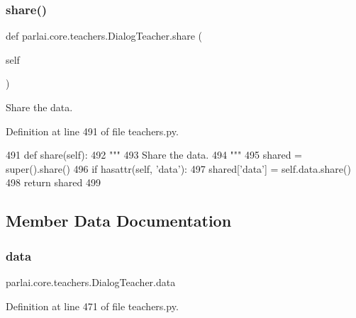 \subsubsection{\texorpdfstring{share()}{share()}}
{\footnotesize\ttfamily def parlai.\+core.\+teachers.\+Dialog\+Teacher.\+share (\begin{DoxyParamCaption}\item[{}]{self }\end{DoxyParamCaption})}

\begin{DoxyVerb}Share the data.
\end{DoxyVerb}
 

Definition at line 491 of file teachers.\+py.


\begin{DoxyCode}
491     \textcolor{keyword}{def }share(self):
492         \textcolor{stringliteral}{"""}
493 \textcolor{stringliteral}{        Share the data.}
494 \textcolor{stringliteral}{        """}
495         shared = super().share()
496         \textcolor{keywordflow}{if} hasattr(self, \textcolor{stringliteral}{'data'}):
497             shared[\textcolor{stringliteral}{'data'}] = self.data.share()
498         \textcolor{keywordflow}{return} shared
499 
\end{DoxyCode}


\subsection{Member Data Documentation}
\mbox{\label{classparlai_1_1core_1_1teachers_1_1DialogTeacher_a6089018ef23e5f55862292d25628e6a5}} 
\subsubsection{\texorpdfstring{data}{data}}
{\footnotesize\ttfamily parlai.\+core.\+teachers.\+Dialog\+Teacher.\+data}



Definition at line 471 of file teachers.\+py.

\mbox{\label{classparlai_1_1core_1_1teachers_1_1DialogTeacher_a4bd247f78e23331700e150991d0afdba}} 

